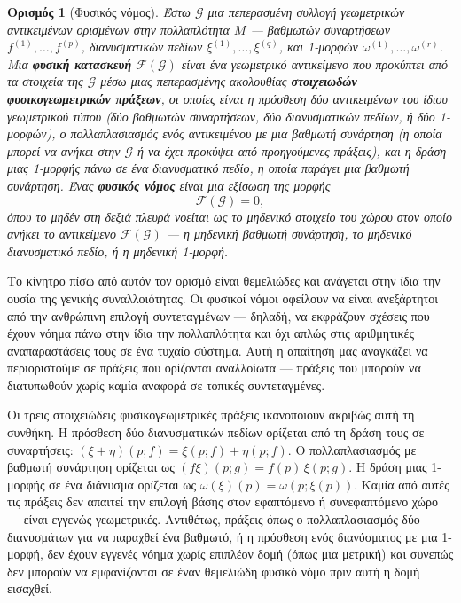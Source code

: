 \documentclass[11pt,a4paper,twoside,openright]{book}
\newtheorem{definition}[lemma]{Ορισμός}
\begin{document}
\begin{definition}[Φυσικός νόμος]
Έστω $\mathcal{G}$ μια πεπερασμένη συλλογή γεωμετρικών αντικειμένων ορισμένων στην πολλαπλότητα $M$ — βαθμωτών συναρτήσεων $f^{(1)}, \dots, f^{(p)}$, διανυσματικών πεδίων $\xi^{(1)}, \dots, \xi^{(q)}$, και 1-μορφών $\omega^{(1)}, \dots, \omega^{(r)}$. Μια \textbf{φυσική κατασκευή} $\mathcal{F}(\mathcal{G})$ είναι ένα γεωμετρικό αντικείμενο που προκύπτει από τα στοιχεία της $\mathcal{G}$ μέσω μιας πεπερασμένης ακολουθίας \textbf{στοιχειωδών φυσικογεωμετρικών πράξεων}, οι οποίες είναι η πρόσθεση δύο αντικειμένων του ίδιου γεωμετρικού τύπου (δύο βαθμωτών συναρτήσεων, δύο διανυσματικών πεδίων, ή δύο 1-μορφών), ο πολλαπλασιασμός ενός αντικειμένου με μια βαθμωτή συνάρτηση (η οποία μπορεί να ανήκει στην $\mathcal{G}$ ή να έχει προκύψει από προηγούμενες πράξεις), και η δράση μιας 1-μορφής πάνω σε ένα διανυσματικό πεδίο, η οποία παράγει μια βαθμωτή συνάρτηση. Ένας \textbf{φυσικός νόμος} είναι μια εξίσωση της μορφής
\begin{equation}
\mathcal{F}(\mathcal{G}) = 0, \tag{0.32}
\end{equation}
όπου το μηδέν στη δεξιά πλευρά νοείται ως το μηδενικό στοιχείο του χώρου στον οποίο ανήκει το αντικείμενο $\mathcal{F}(\mathcal{G})$ — η μηδενική βαθμωτή συνάρτηση, το μηδενικό διανυσματικό πεδίο, ή η μηδενική 1-μορφή.
\end{definition}

Το κίνητρο πίσω από αυτόν τον ορισμό είναι θεμελιώδες και ανάγεται στην ίδια την ουσία της γενικής συναλλοιότητας. Οι φυσικοί νόμοι οφείλουν να είναι ανεξάρτητοι από την ανθρώπινη επιλογή συντεταγμένων — δηλαδή, να εκφράζουν σχέσεις που έχουν νόημα πάνω στην ίδια την πολλαπλότητα και όχι απλώς στις αριθμητικές αναπαραστάσεις τους σε ένα τυχαίο σύστημα. Αυτή η απαίτηση μας αναγκάζει να περιοριστούμε σε πράξεις που ορίζονται αναλλοίωτα — πράξεις που μπορούν να διατυπωθούν χωρίς καμία αναφορά σε τοπικές συντεταγμένες.

Οι τρεις στοιχειώδεις φυσικογεωμετρικές πράξεις ικανοποιούν ακριβώς αυτή τη συνθήκη. Η πρόσθεση δύο διανυσματικών πεδίων ορίζεται από τη δράση τους σε συναρτήσεις: $(\xi + \eta)(p; f) = \xi(p; f) + \eta(p; f)$. Ο πολλαπλασιασμός με βαθμωτή συνάρτηση ορίζεται ως $(f \xi)(p; g) = f(p) \, \xi(p; g)$. Η δράση μιας 1-μορφής σε ένα διάνυσμα ορίζεται ως $\omega(\xi)(p) = \omega(p; \xi(p))$. Καμία από αυτές τις πράξεις δεν απαιτεί την επιλογή βάσης στον εφαπτόμενο ή συνεφαπτόμενο χώρο — είναι εγγενώς γεωμετρικές. Αντιθέτως, πράξεις όπως ο πολλαπλασιασμός δύο διανυσμάτων για να παραχθεί ένα βαθμωτό, ή η πρόσθεση ενός διανύσματος με μια 1-μορφή, δεν έχουν εγγενές νόημα χωρίς επιπλέον δομή (όπως μια μετρική) και συνεπώς δεν μπορούν να εμφανίζονται σε έναν θεμελιώδη φυσικό νόμο πριν αυτή η δομή εισαχθεί.
\end{document}
